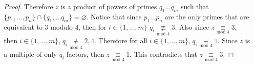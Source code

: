 \documentclass[12pt]{article}
\begin{document}
\begin{enumerate}
\begin{proof}
                Therefore $z$ is a product of powers of primes $q_1 \ldots q_m$ such that $\{p_1, \ldots, p_n\} \cap \{q_1, \ldots q_m\} = \varnothing$. Notice that since $p_1 \ldots p_n$ are the only primes that are equivalent to $3$ modulo $4$, then for $i \in \{1, \ldots,m\}$ $q_i \underset{\textrm{mod }4}{\not \equiv} 3$. Also since $z \underset{\textrm{mod }4}{\equiv} 3$, then $i \in \{1, \ldots,m\}$, $q_i \underset{\textrm{mod }4}{\not \equiv} 2,4$. Therefore for all $i \in \{1, \ldots,m\}$, $q_i \underset{\textrm{mod }4}{ \equiv} 1$. Since $z$ is a multiple of only $q_i$ factors, then $z \underset{\textrm{mod }4}{\equiv} 1$. This contradicts that $z \underset{\textrm{mod }4}{\equiv} 3$.
            \end{proof}

\end{enumerate}
    
\end{document}
